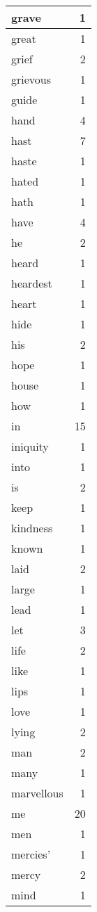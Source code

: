 \begin{center}
\begin{longtable}{l|r}
grave & 1 \\ \hline
great & 1 \\ \hline
grief & 2 \\ \hline
grievous & 1 \\ \hline
guide & 1 \\ \hline
hand & 4 \\ \hline
hast & 7 \\ \hline
haste & 1 \\ \hline
hated & 1 \\ \hline
hath & 1 \\ \hline
have & 4 \\ \hline
he & 2 \\ \hline
heard & 1 \\ \hline
heardest & 1 \\ \hline
heart & 1 \\ \hline
hide & 1 \\ \hline
his & 2 \\ \hline
hope & 1 \\ \hline
house & 1 \\ \hline
how & 1 \\ \hline
in & 15 \\ \hline
iniquity & 1 \\ \hline
into & 1 \\ \hline
is & 2 \\ \hline
keep & 1 \\ \hline
kindness & 1 \\ \hline
known & 1 \\ \hline
laid & 2 \\ \hline
large & 1 \\ \hline
lead & 1 \\ \hline
let & 3 \\ \hline
life & 2 \\ \hline
like & 1 \\ \hline
lips & 1 \\ \hline
love & 1 \\ \hline
lying & 2 \\ \hline
man & 2 \\ \hline
many & 1 \\ \hline
marvellous & 1 \\ \hline
me & 20 \\ \hline
men & 1 \\ \hline
mercies' & 1 \\ \hline
mercy & 2 \\ \hline
mind & 1 \\ \hline

\end{longtable}
\end{center}
